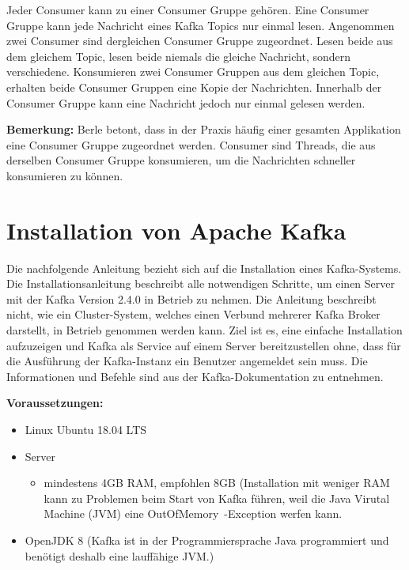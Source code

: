 \documentclass[a4paper,titlepage,halfparskip,12pt]{scrreprt}
\begin{document}
\begin{onehalfspacing}
Jeder Consumer kann zu einer Consumer Gruppe gehören. Eine Consumer Gruppe kann jede Nachricht eines Kafka Topics nur einmal lesen. Angenommen zwei Consumer sind dergleichen Consumer Gruppe zugeordnet. Lesen beide aus dem gleichem Topic, lesen beide niemals die gleiche Nachricht, sondern verschiedene. Konsumieren zwei Consumer Gruppen aus dem gleichen Topic, erhalten beide Consumer Gruppen eine Kopie der Nachrichten. Innerhalb der Consumer Gruppe kann eine Nachricht jedoch nur einmal gelesen werden.\cite{berleKafkaOverview, nannoniDissKafka}

\textbf{Bemerkung:} Berle \cite{berleKafkaOverview} betont, dass in der Praxis häufig einer gesamten Applikation eine Consumer Gruppe zugeordnet werden. Consumer sind Threads, die aus derselben Consumer Gruppe konsumieren, um die Nachrichten schneller konsumieren zu können.

\pagebreak

\section{Installation von Apache Kafka}
\label{sec:InstallationKafka}

Die nachfolgende Anleitung bezieht sich auf die Installation eines Kafka-Systems. Die Installationsanleitung beschreibt alle notwendigen Schritte, um einen Server mit der Kafka Version 2.4.0 in Betrieb zu nehmen. Die Anleitung beschreibt nicht, wie ein Cluster-System, welches einen Verbund mehrerer Kafka Broker darstellt, in Betrieb genommen werden kann. Ziel ist es, eine einfache Installation aufzuzeigen und Kafka als Service auf einem Server bereitzustellen ohne, dass für die Ausführung der Kafka-Instanz ein Benutzer angemeldet sein muss. Die Informationen und Befehle sind aus der Kafka-Dokumentation \cite{kafkaDoc} zu entnehmen.

\bigskip

\textbf{Voraussetzungen:}

\smallskip

\begin{itemize}
\item Linux Ubuntu 18.04 LTS
\item Server
\begin{itemize}
\item mindestens 4GB RAM, empfohlen 8GB (Installation mit weniger RAM kann zu Problemen beim Start von Kafka führen, weil die Java Virutal Machine (JVM) eine \glqq OutOfMemory\grqq\ -Exception werfen kann.
\end{itemize}
\item OpenJDK 8 (Kafka ist in der Programmiersprache Java programmiert und benötigt deshalb eine lauffähige JVM.)
\end{itemize}


\end{onehalfspacing}
\end{document}
